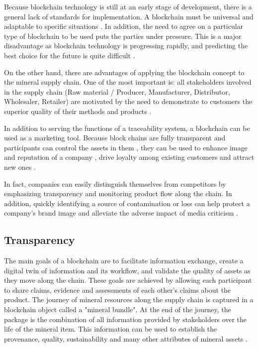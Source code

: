 Because blockchain technology is still at an early stage of development, there is a general lack of standards for implementation. A blockchain must be universal and adaptable to specific situations \cite{valenta2017comparison}. In addition, the need to agree on a particular type of blockchain to be used puts the parties under pressure. This is a major disadvantage as blockchain technology is progressing rapidly, and predicting the best choice for the future is quite difficult \cite{galvez2018future}.

On the other hand, there are advantages of applying the blockchain concept to the mineral supply chain. One of the most important is: all stakeholders involved in the supply chain (Raw material / Producer, Manufacturer, Distributor, Wholesaler, Retailer) are motivated by the need to demonstrate to customers the superior quality of their methods and products \cite{lu2017adaptable}. 

In addition to serving the functions of a traceability system, a blockchain can be used as a marketing tool. Because block chains are fully transparent\cite{iansiti2017truth} and participants can control the assets in them \cite{liao2011food}, they can be used to enhance image and reputation of a company \cite{van2007essentials}, drive loyalty among existing customers \cite{pizzuti2015global} and attract new ones \cite{svensson2009transparency}. 

In fact, companies can easily distinguish themselves from competitors by emphasizing transparency and monitoring product flow along the chain. In addition, quickly identifying a source of contamination or loss can help protect a company's brand image \cite{mejia2010traceability} and alleviate the adverse impact of media criticism \cite{dabbene2011food}.

\subsection{Transparency}\label{sec:transparency}

The main goals of a blockchain are to facilitate information exchange, create a digital twin of information and its workflow, and validate the quality of assets as they move along the chain. These goals are achieved by allowing each participant to share claims, evidence and assessments of each other's claims about the product. The journey of mineral resources along the supply chain is captured in a blockchain object called a "mineral bundle". At the end of the journey, the package is the combination of all information provided by stakeholders over the life of the mineral item. This information can be used to establish the provenance, quality, sustainability and many other attributes of mineral assets \cite{martin2017technology}.

